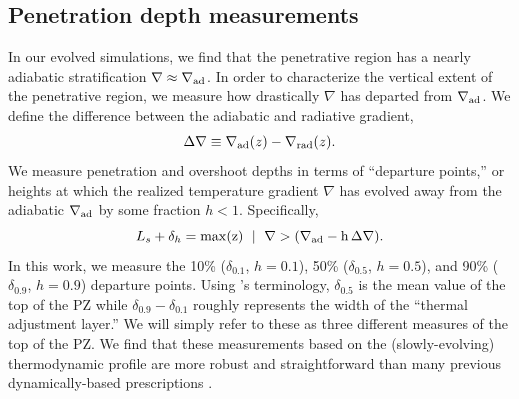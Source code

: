 \documentclass[twocolumn]{aastex631}
\newcommand{\gradrad}{\ensuremath{\nabla_{\rm{rad}}}}
\newcommand{\gradad}{\ensuremath{\nabla_{\rm{ad}}}}
\newcommand{\justgrad}{\ensuremath{\nabla}}
\begin{document}
\subsection{Penetration depth measurements}
In our evolved simulations, we find that the penetrative region has a nearly adiabatic stratification $\justgrad \approx \gradad$.
In order to characterize the vertical extent of the penetrative region, we measure how drastically $\justgrad$ has departed from $\gradad$.
We define the difference between the adiabatic and radiative gradient,
\begin{equation}
\Delta\justgrad \equiv \gradad(z) - \gradrad(z).
\end{equation}
We measure penetration and overshoot depths in terms of ``departure points,'' or heights at which the realized temperature gradient $\justgrad$ has evolved away from the adiabatic $\gradad$ by some fraction $h < 1$.
Specifically,
\begin{equation}
L_s + \delta_{h} = \rm{max}(z) \,\,\mid\,\, \justgrad > (\gradad - h\,\Delta\justgrad).
\label{eqn:delta_p_measures}
\end{equation}
In this work, we measure the 10\% ($\delta_{0.1}$, $h=0.1$), 50\% ($\delta_{0.5}$, $h=0.5$), and 90\% ($\delta_{0.9}$, $h=0.9$) departure points.
Using \citet{zahn1991}'s terminology, $\delta_{0.5}$ is the mean value of the top of the PZ while $\delta_{0.9} - \delta_{0.1}$ roughly represents the width of the ``thermal adjustment layer.''
We will simply refer to these as three different measures of the top of the PZ.
We find that these measurements based on the (slowly-evolving) thermodynamic profile are more robust and straightforward than many previous dynamically-based prescriptions \citep[see e.g.,][for a nice discussion]{pratt_etal_2017}.
\end{document}
